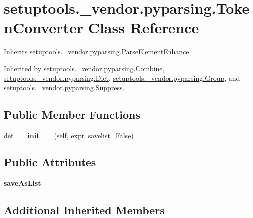 \hypertarget{classsetuptools_1_1__vendor_1_1pyparsing_1_1_token_converter}{}\section{setuptools.\+\_\+vendor.\+pyparsing.\+Token\+Converter Class Reference}
\label{classsetuptools_1_1__vendor_1_1pyparsing_1_1_token_converter}


Inherits \hyperlink{classsetuptools_1_1__vendor_1_1pyparsing_1_1_parse_element_enhance}{setuptools.\+\_\+vendor.\+pyparsing.\+Parse\+Element\+Enhance}.



Inherited by \hyperlink{classsetuptools_1_1__vendor_1_1pyparsing_1_1_combine}{setuptools.\+\_\+vendor.\+pyparsing.\+Combine}, \hyperlink{classsetuptools_1_1__vendor_1_1pyparsing_1_1_dict}{setuptools.\+\_\+vendor.\+pyparsing.\+Dict}, \hyperlink{classsetuptools_1_1__vendor_1_1pyparsing_1_1_group}{setuptools.\+\_\+vendor.\+pyparsing.\+Group}, and \hyperlink{classsetuptools_1_1__vendor_1_1pyparsing_1_1_suppress}{setuptools.\+\_\+vendor.\+pyparsing.\+Suppress}.

\subsection*{Public Member Functions}
\begin{DoxyCompactItemize}
\item 
\mbox{\label{classsetuptools_1_1__vendor_1_1pyparsing_1_1_token_converter_a93c81a9a0c4da7bd9ceb4286d15946a8}} 
def {\bfseries \+\_\+\+\_\+init\+\_\+\+\_\+} (self, expr, savelist=False)
\end{DoxyCompactItemize}
\subsection*{Public Attributes}
\begin{DoxyCompactItemize}
\item 
\mbox{\label{classsetuptools_1_1__vendor_1_1pyparsing_1_1_token_converter_a78379695505b245d7aba12470923d760}} 
{\bfseries save\+As\+List}
\end{DoxyCompactItemize}
\subsection*{Additional Inherited Members}


